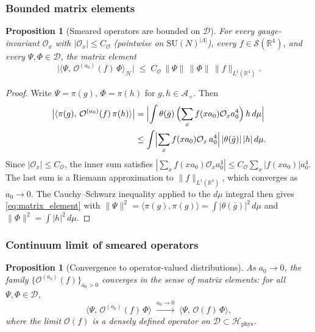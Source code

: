 \documentclass[11pt,a4paper]{amsart}
\newtheorem{proposition}[theorem]{Proposition}
\theoremstyle{definition}
\newcommand{\SU}{\mathrm{SU}}
\newcommand{\R}{\mathbb{R}}
\begin{document}
\subsubsection*{Bounded matrix elements}

\begin{proposition}[Smeared operators are bounded on $\mathcal{D}$]
\label{prop:smeared_bounded}
For every gauge-invariant $\mathcal{O}_x$ with $|\mathcal{O}_x|\le C_\mathcal{O}$
(pointwise on $\SU(N)^{|\Lambda|}$), every $f\in\mathcal{S}(\R^4)$, and every
$\Psi, \Phi \in \mathcal{D}$, the matrix element
\begin{equation}
\label{eq:matrix_element}
  \bigl|\langle\Psi,\, \mathcal{O}^{(a_0)}(f)\,\Phi\rangle_{\mathcal{H}}\bigr|
  \;\le\; C_\mathcal{O}\,\|\Psi\|\,\|\Phi\|\,
  \|f\|_{L^1(\R^4)}.
\end{equation}
\end{proposition}

\begin{proof}
Write $\Psi = \pi(g)$, $\Phi = \pi(h)$ for $g,h\in\mathcal{A}_+$.  Then
\begin{align}
  \bigl|\langle\pi(g),\, \mathcal{O}^{(a_0)}(f)\,\pi(h)\rangle\bigr|
  &= \Bigl|\int \theta(\bar g)\,\Bigl(\sum_x f(xa_0)\mathcal{O}_x a_0^4\Bigr)\,h\,d\mu\Bigr| \notag\\
  &\le \int \Bigl|\sum_x f(xa_0)\mathcal{O}_x\,a_0^4\Bigr|\,|\theta(\bar g)|\,|h|\,d\mu. \notag
\end{align}
Since $|\mathcal{O}_x|\le C_\mathcal{O}$, the inner sum satisfies
$|\sum_x f(xa_0)\mathcal{O}_x a_0^4| \le C_\mathcal{O}\sum_x |f(xa_0)|a_0^4$.
The last sum is a Riemann approximation to $\|f\|_{L^1(\R^4)}$, which converges
as $a_0\to 0$.  The Cauchy--Schwarz inequality applied to the $d\mu$ integral
then gives \eqref{eq:matrix_element} with
$\|\Psi\|^2 = \langle\pi(g),\pi(g)\rangle = \int|\theta(\bar g)|^2\,d\mu$
and $\|\Phi\|^2 = \int |h|^2\,d\mu$.
\end{proof}

\subsubsection*{Continuum limit of smeared operators}

\begin{proposition}[Convergence to operator-valued distributions]
\label{prop:op_convergence}
As $a_0\to 0$, the family $\{\mathcal{O}^{(a_0)}(f)\}_{a_0 > 0}$ converges in the
sense of matrix elements: for all $\Psi,\Phi\in\mathcal{D}$,
\[
  \langle\Psi,\,\mathcal{O}^{(a_0)}(f)\,\Phi\rangle
  \;\xrightarrow{a_0\to 0}\;
  \langle\Psi,\,\mathcal{O}(f)\,\Phi\rangle,
\]
where the limit $\mathcal{O}(f)$ is a densely defined operator on
$\mathcal{D}\subset\mathcal{H}_{\mathrm{phys}}$.
\end{proposition}
\end{document}
